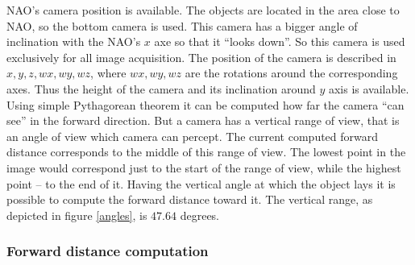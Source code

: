       NAO's camera position is available. The objects are located in the area close to NAO, so the bottom camera is used. This camera has a bigger angle of inclination with the NAO's \(x\) axe so that it ``looks down''. So this camera is used exclusively for all image acquisition. The position of the camera is described in \(x, y, z, wx, wy, wz\), where \(wx, wy, wz\) are the rotations around the corresponding axes. Thus the height of the camera and its inclination around \(y\) axis is available. Using simple Pythagorean theorem it can be computed how far the camera ``can see'' in the forward direction. But a camera has a vertical range of view, that is an angle of view which camera can percept. The current computed forward distance corresponds to the middle of this range of view. The lowest point in the image would correspond just to the start of the range of view, while the highest point -- to the end of it. Having the vertical angle at which the object lays it is possible to compute the forward distance toward it. The vertical range, as depicted in figure \ref{angles}, is \(47.64\) degrees.

      \subsubsection{Forward distance computation}

